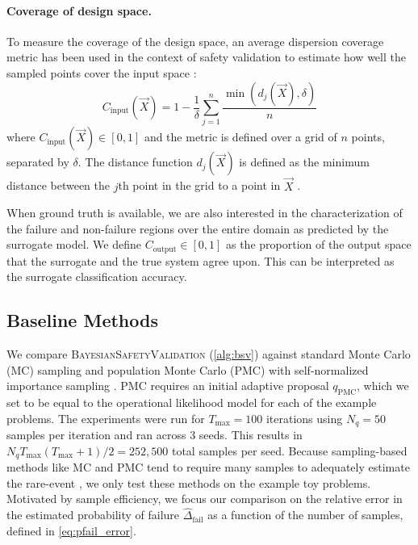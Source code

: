 \paragraph{Coverage of design space.} To measure the coverage of the design space, an average dispersion coverage metric has been used in the context of safety validation to estimate how well the sampled points cover the input space \cite{esposito2005adaptive, corso2021survey}:
\begin{equation}
    C_\text{input}(\vec{X}) = 1 - \frac{1}{\delta} \sum_{j=1}^n \frac{\min(d_j(\vec{X}), \delta)}{n}
\end{equation}
where $C_\text{input}(\vec{X}) \in [0,1]$ and the metric is defined over a grid of $n$ points, separated by $\delta$.
The distance function $d_j(\vec{X})$ is defined as the minimum distance between the $j$th point in the grid to a point in $\vec{X}$ \cite{esposito2005adaptive, corso2021survey}.

When ground truth is available, we are also interested in the characterization of the failure and non-failure regions over the entire domain as predicted by the surrogate model. We define $C_\text{output} \in [0,1]$ as the proportion of the output space that the surrogate and the true system agree upon.
This can be interpreted as the surrogate classification accuracy.


\subsection{Baseline Methods}
We compare \textsc{BayesianSafetyValidation} (\cref{alg:bsv}) against standard Monte Carlo (MC) sampling and population Monte Carlo (PMC) \cite{cappe2004population} with self-normalized importance sampling \cite{owen2013monte}.
PMC requires an initial adaptive proposal $q_\text{PMC}$, which we set to be equal to the operational likelihood model for each of the example problems.
The experiments were run for $T_\text{max} = 100$ iterations using $N_q = 50$ samples per iteration and ran across $3$ seeds.
This results in $N_qT_\text{max}(T_\text{max} + 1)/2 = 252{,}500$ total samples per seed.
Because sampling-based methods like MC and PMC tend to require many samples to adequately estimate the rare-event \cite{de2005tutorial}, we only test these methods on the example toy problems.
Motivated by sample efficiency, we focus our comparison on the relative error in the estimated probability of failure $\hat{\Delta}_\text{fail}$ as a function of the number of samples, defined in \cref{eq:pfail_error}.


